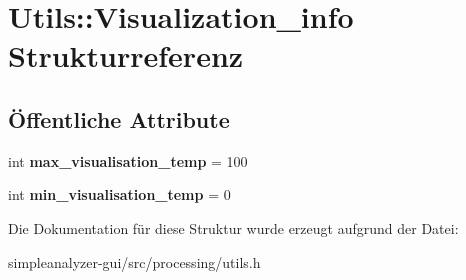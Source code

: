 \hypertarget{structUtils_1_1Visualization__info}{\section{Utils\-:\-:Visualization\-\_\-info Strukturreferenz}
\label{structUtils_1_1Visualization__info}
}
\subsection*{Öffentliche Attribute}
\begin{DoxyCompactItemize}
\item 
\hypertarget{structUtils_1_1Visualization__info_a5327787a12634166ecc00f2224d3f39f}{int {\bfseries max\-\_\-visualisation\-\_\-temp} = 100}\label{structUtils_1_1Visualization__info_a5327787a12634166ecc00f2224d3f39f}

\item 
\hypertarget{structUtils_1_1Visualization__info_a6e192352d1f00709f8ef963206ff2653}{int {\bfseries min\-\_\-visualisation\-\_\-temp} = 0}\label{structUtils_1_1Visualization__info_a6e192352d1f00709f8ef963206ff2653}

\end{DoxyCompactItemize}


Die Dokumentation für diese Struktur wurde erzeugt aufgrund der Datei\-:\begin{DoxyCompactItemize}
\item 
simpleanalyzer-\/gui/src/processing/utils.\-h\end{DoxyCompactItemize}
